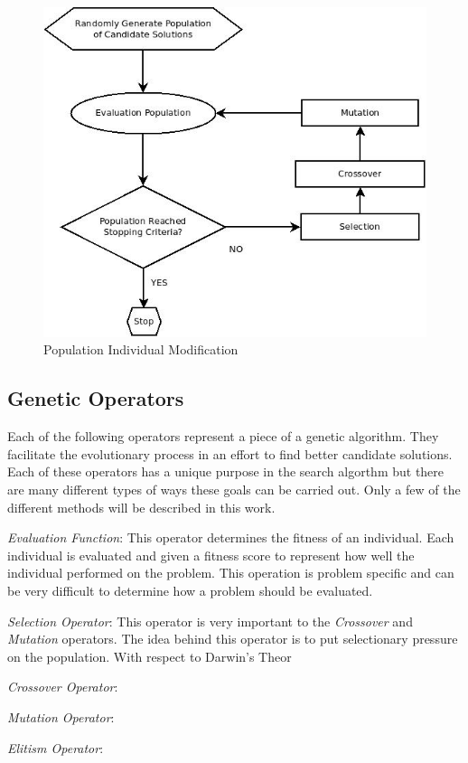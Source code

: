 \begin{figure}
	\centering
	\includegraphics[bb=0 0 559 481,scale=0.5]{figures/GA.jpeg}
	\caption{Population Individual Modification}
	\label{figure:gaFlowchart}
\end{figure}

\subsection{Genetic Operators}

Each of the following operators represent a piece of a genetic algorithm. They facilitate the evolutionary process in an effort to find better candidate solutions. Each of these operators has a unique purpose in the search algorthm but there are many different types of ways these goals can be carried out. Only a few of the different methods will be described in this work.

\textit{Evaluation Function}: This operator determines the fitness of an individual. Each individual is evaluated and given a fitness score to represent how well the individual performed on the problem. This operation is problem specific and can be very difficult to determine how a problem should be evaluated.

\textit{Selection Operator}: This operator is very important to the \textit{Crossover} and \textit{Mutation} operators. The idea behind this operator is to put selectionary pressure on the population. With respect to Darwin's Theor

\textit{Crossover Operator}:

\textit{Mutation Operator}:

\textit{Elitism Operator}:

